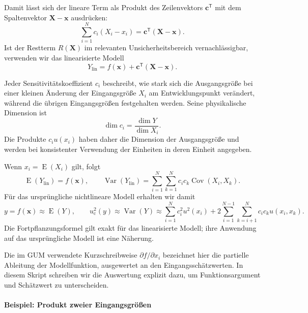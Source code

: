 Damit lässt sich der lineare Term als Produkt des
Zeilenvektors $\mathbf c^\mathsf T$ mit dem Spaltenvektor
$\mathbf X-\mathbf x$ ausdrücken:
\begin{equation}
\sum_{i=1}^N c_i(X_i-x_i)
=
\mathbf c^\mathsf T(\mathbf X-\mathbf x).
\end{equation}
Ist der Restterm $R(\mathbf X)$ im relevanten Unsicherheitsbereich
vernachlässigbar, verwenden wir das linearisierte Modell
\begin{equation}
Y_{\mathrm{lin}}
=
f(\mathbf x)+\mathbf c^\mathsf T(\mathbf X-\mathbf x).
\label{eq:linearisiertesModell}
\end{equation}

Jeder Sensitivitätskoeffizient $c_i$ beschreibt, wie stark sich
die Ausgangsgröße bei einer kleinen Änderung der Eingangsgröße
$X_i$ am Entwicklungspunkt verändert, während die übrigen
Eingangsgrößen festgehalten werden. Seine physikalische
Dimension ist
\begin{equation}
\dim c_i=\frac{\dim Y}{\dim X_i}.
\end{equation}
Die Produkte $c_i u(x_i)$ haben daher die Dimension der
Ausgangsgröße und werden bei konsistenter Verwendung der
Einheiten in deren Einheit angegeben.

Wenn $x_i=\operatorname E(X_i)$ gilt, folgt
\begin{equation}
\operatorname E(Y_{\mathrm{lin}})=f(\mathbf x),\qquad
\operatorname{Var}(Y_{\mathrm{lin}})=
\sum_{i=1}^N\sum_{k=1}^N c_ic_k\operatorname{Cov}(X_i,X_k).
\end{equation}
Für das ursprüngliche nichtlineare Modell erhalten wir damit
\begin{equation}
y=f(\mathbf x)\approx\operatorname E(Y),\qquad
u_{\mathrm c}^2(y)\approx\operatorname{Var}(Y)
\approx\sum_{i=1}^N c_i^2u^2(x_i)
+2\sum_{i=1}^{N-1}\sum_{k=i+1}^N c_ic_k u(x_i,x_k).
\label{UnsicherFortpflLinearisiert}
\end{equation}
Die Fortpflanzungsformel gilt exakt für das linearisierte Modell; ihre
Anwendung auf das ursprüngliche Modell ist eine Näherung.

Die im GUM verwendete Kurzschreibweise $\partial f/\partial x_i$ bezeichnet
hier die partielle Ableitung der Modellfunktion, ausgewertet an den
Eingangsschätzwerten. In diesem Skript schreiben wir die Auswertung
explizit dazu, um Funktionsargument und Schätzwert zu unterscheiden.

\paragraph{Beispiel: Produkt zweier Eingangsgrößen}

